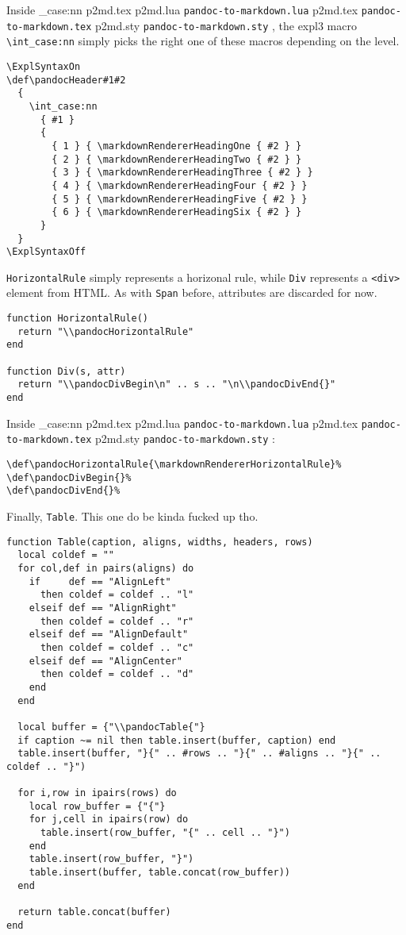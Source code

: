 \documentclass[
  digital,     %
  oneside,     %
  nosansbold,  %
  nocolorbold, %
  lof,         %
  nolot,       %
]{fithesis4}
\newcommand\macro[1]{\texttt{\textbackslash{}{#1}}}
\newcommand\file[1]
  {
    \str_case:nn
      { #1 }
      {
        { p2md.lua } { \texttt{pandoc\hyp{}to\hyp{}markdown.lua} }
        { p2md.tex } { \texttt{pandoc\hyp{}to\hyp{}markdown.tex} }
        { p2md.sty } { \texttt{pandoc\hyp{}to\hyp{}markdown.sty} }
      }
  }
\begin{document}
\noindent
Inside \file{p2md.tex}, the expl3 macro \macro{int\_case:nn} simply picks the right one of these macros depending on the level.

\noindent
\lstset{language=[plain]TeX}
\begin{lstlisting}
\ExplSyntaxOn
\def\pandocHeader#1#2
  {
    \int_case:nn
      { #1 }
      {
        { 1 } { \markdownRendererHeadingOne { #2 } }
        { 2 } { \markdownRendererHeadingTwo { #2 } }
        { 3 } { \markdownRendererHeadingThree { #2 } }
        { 4 } { \markdownRendererHeadingFour { #2 } }
        { 5 } { \markdownRendererHeadingFive { #2 } }
        { 6 } { \markdownRendererHeadingSix { #2 } }
      }
  }
\ExplSyntaxOff
\end{lstlisting}

\noindent
\texttt{HorizontalRule} simply represents a horizonal rule, while \texttt{Div} represents a \texttt{<div>} element from HTML. As with \texttt{Span} before, attributes are discarded for now.

\noindent
\lstset{language=[5.3]Lua}
\begin{lstlisting}
function HorizontalRule()
  return "\\pandocHorizontalRule"
end

function Div(s, attr)
  return "\\pandocDivBegin\n" .. s .. "\n\\pandocDivEnd{}"
end
\end{lstlisting}

\noindent
Inside \file{p2md.tex}:

\noindent
\lstset{language=[plain]TeX}
\begin{lstlisting}
\def\pandocHorizontalRule{\markdownRendererHorizontalRule}%
\def\pandocDivBegin{}%
\def\pandocDivEnd{}%
\end{lstlisting}

\noindent
Finally, \texttt{Table}. This one do be kinda fucked up tho.

\noindent
\lstset{language=[5.3]Lua}
\begin{lstlisting}
function Table(caption, aligns, widths, headers, rows)
  local coldef = ""
  for col,def in pairs(aligns) do
    if     def == "AlignLeft"
      then coldef = coldef .. "l"
    elseif def == "AlignRight"
      then coldef = coldef .. "r"
    elseif def == "AlignDefault"
      then coldef = coldef .. "c"
    elseif def == "AlignCenter"
      then coldef = coldef .. "d"
    end
  end

  local buffer = {"\\pandocTable{"}
  if caption ~= nil then table.insert(buffer, caption) end
  table.insert(buffer, "}{" .. #rows .. "}{" .. #aligns .. "}{" .. coldef .. "}")

  for i,row in ipairs(rows) do
    local row_buffer = {"{"}
    for j,cell in ipairs(row) do
      table.insert(row_buffer, "{" .. cell .. "}")
    end
    table.insert(row_buffer, "}")
    table.insert(buffer, table.concat(row_buffer))
  end

  return table.concat(buffer)
end
\end{lstlisting}
\end{document}
